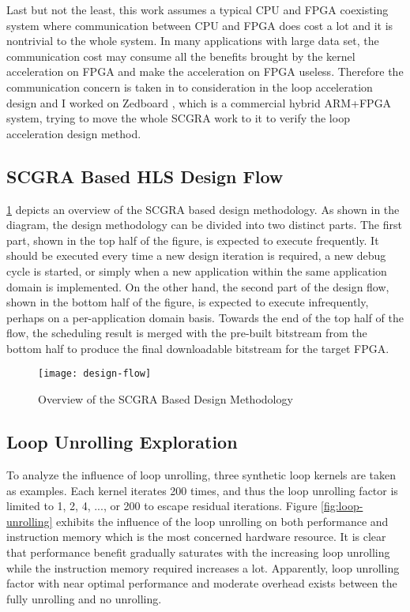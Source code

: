 \documentclass[12pt]{article} %
\begin{document}
Last but not the least, this work assumes a typical CPU and FPGA coexisting
system where communication between CPU and FPGA does cost a lot and it is nontrivial to the whole
system. In many applications with large data set, the communication cost may consume all the benefits 
brought by the kernel acceleration on FPGA and make the acceleration on FPGA useless. Therefore the
communication concern is taken in to consideration in the loop acceleration design and I worked on
Zedboard \cite{zedboard}, which is a commercial hybrid ARM+FPGA system, trying to move the whole SCGRA
work to it to verify the loop acceleration design method.

\subsection{SCGRA Based HLS Design Flow}
\ref{fig:design-flow} depicts an overview of the SCGRA based design methodology. As shown in the
diagram, the design methodology can be divided into two distinct parts. The first part, shown in the
top half of the figure, is expected to execute frequently. It should be executed every time a new
design iteration is required, a new debug cycle is started, or simply when a new application within
the same application domain is implemented. On the other hand, the second part of the design flow,
shown in the bottom half of the figure, is expected to execute infrequently, perhaps on a
per-application domain basis. Towards the end of the top half of the flow, the scheduling result is
merged with the pre-built bitstream from the bottom half to produce the final downloadable bitstream
for the target FPGA.
\begin{figure}[H]
\centering
\texttt{[image: design-flow]}
\caption{Overview of the SCGRA Based Design Methodology}
\label{fig:design-flow}
\end{figure}

\subsection{Loop Unrolling Exploration}
To analyze the influence of loop unrolling, three synthetic loop kernels are taken as examples. Each
kernel iterates 200 times, and thus the loop unrolling factor is limited to 1, 2, 4, ..., or 200 to
escape residual iterations. Figure \ref{fig:loop-unrolling} exhibits the influence of the loop unrolling 
on both performance and instruction memory which is the most concerned hardware resource. It is
clear that performance benefit gradually saturates with the increasing loop unrolling while the
instruction memory required increases a lot. Apparently, loop unrolling factor with near optimal
performance and moderate overhead exists between the fully unrolling and no unrolling.
\end{document}
